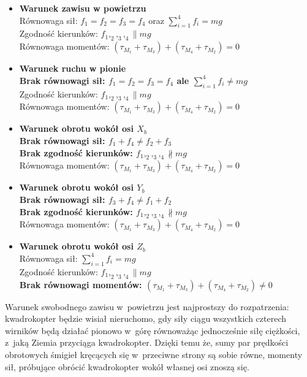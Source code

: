 \begin{itemize}
	\item \textbf{Warunek zawisu w powietrzu}\\ Równowaga sił: $f_1 = f_2 = f_3 = f_4$ oraz $\sum_{i=1}^{4} f_i = mg$ \\ Zgodność kierunków: $f_1,_2,_3,_4 \parallel mg$ \\Równowaga momentów: $(\tau_{M_1} + \tau_{M_3}) + (\tau_{M_4} + \tau_{M_2}) = 0$ 
	\item \textbf{Warunek ruchu w pionie} \\ \textbf{Brak równowagi sił: $f_1 = f_2 = f_3 = f_4$ ale  $\sum_{i=1}^{4} f_i \neq mg$} \\ Zgodność kierunków: $f_1,_2,_3,_4 \parallel mg$ \\ Równowaga momentów: $(\tau_{M_1} + \tau_{M_3}) + (\tau_{M_4} + \tau_{M_2}) = 0$  
	\item \textbf{Warunek obrotu wokół osi $X_b$} \\ \textbf{Brak równowagi sił: $f_1 + f_4 \neq f_2 + f_3 $} \\ \textbf{Brak zgodność kierunków: $f_1,_2,_3,_4 \not\parallel mg$} \\ Równowaga momentów: $(\tau_{M_1} + \tau_{M_3}) + (\tau_{M_4} + \tau_{M_2}) = 0$ \\ 
	\item \textbf{Warunek obrotu wokół osi $Y_b$} \\ \textbf{Brak równowagi sił: $f_3 + f_4 \neq f_1 + f_2$} \\ \textbf{Brak zgodność kierunków: $f_1,_2,_3,_4 \not\parallel mg$} \\ Równowaga momentów: $(\tau_{M_1} + \tau_{M_3}) + (\tau_{M_4} + \tau_{M_2}) = 0$ \\
	\item \textbf{Warunek obrotu wokół osi $Z_b$} \\ Równowaga sił: $\sum_{i=1}^{4} f_i = mg$ \\ Zgodność kierunków: $f_1,_2,_3,_4 \parallel mg$ \\ \textbf{Brak równowagi momentów: $(\tau_{M_1} + \tau_{M_3}) + (\tau_{M_4} + \tau_{M_2}) \neq 0 $}\\ 

\end{itemize}

Warunek swobodnego zawisu w~powietrzu jest najprostszy do rozpatrzenia: kwadrokopter będzie wisiał nieruchomo, gdy siły ciągu wszystkich czterech wirników będą działać pionowo w~górę równoważąc jednocześnie siłę ciężkości, z~jaką Ziemia przyciąga kwadrokopter. Dzięki temu że, sumy par prędkości obrotowych śmigieł kręcących się w~przeciwne strony są sobie równe, momenty sił, próbujące obrócić kwadrokopter wokół własnej osi znoszą się.

